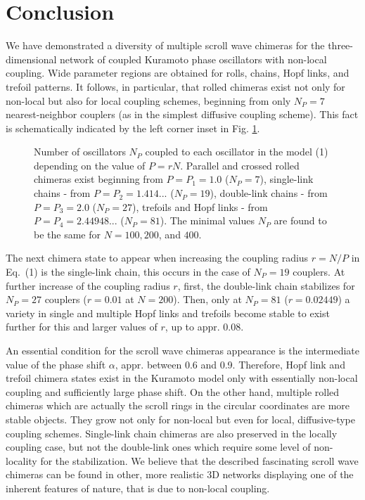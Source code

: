 \documentclass[epjST]{svjour}
\begin{document}
\vspace*{-0.5cm}
\section{Conclusion} 

\hspace*{0.5cm} We have demonstrated a diversity of multiple scroll wave chimeras for the  three-dimensional network of coupled Kuramoto phase oscillators with non-local coupling.  Wide parameter regions are obtained for rolls, chains, Hopf links, and trefoil patterns.  It follows, in particular, that rolled chimeras exist not only for non-local but also for local coupling schemes, beginning from only $N_P=7$ nearest-neighbor couplers (as in the simplest diffusive coupling scheme). This fact is schematically indicated by the left corner inset in Fig. \ref{fig:14}. 

\begin{figure}[h]\sidecaption
{}
\caption{
Number of oscillators $N_P$ coupled to each oscillator in the model (1) depending on the value of $P=rN$. Parallel and crossed rolled chimeras exist beginning from $P=P_{1}=1.0$ ($N_{P}=7$), single-link chains - from $P=P_{2} =  1.414...$ ($N_{P}=19$), double-link  chains - from $P=P_{3} =  2.0$ ($N_{P}=27$), trefoils and Hopf links - from $P=P_{4} =  2.44948...$ ($N_{P}=81$). The minimal values  $N_{P}$ are found to be the same  for $N=100, 200$, and $400$. }
\label{fig:14}
\end{figure}

The next chimera state to appear when increasing the coupling radius $r=N/P$ in Eq.~(1) is the single-link chain, this occurs in the case of  $N_P=19$ couplers. At further increase of the coupling radius $r$, first, the double-link chain stabilizes for $N_P=27$ couplers ($r=0.01$ at $N=200$). 
Then, only at $N_P=81$  ($r=0.02449$) a variety in single and multiple Hopf links and trefoils become stable to exist further for this and larger values of $r$, up to appr. 0.08.

An essential condition for the scroll wave chimeras appearance is the  intermediate value of the phase shift $\alpha$, appr. between 0.6 and 0.9.  Therefore, Hopf link and trefoil chimera states exist in the Kuramoto model only with essentially non-local coupling and sufficiently large phase shift. On the other hand, multiple rolled chimeras  which are actually the scroll rings in the circular coordinates are more stable objects. They grow not only for non-local but even for local,  diffusive-type coupling schemes.  Single-link chain chimeras are also preserved in the locally coupling case, but not the double-link ones which require some level of non-locality for the stabilization.  We believe that the described  fascinating scroll wave chimeras can be found in other, more realistic 3D networks displaying one of the inherent features of nature, that is due to non-local coupling.  
\end{document}
